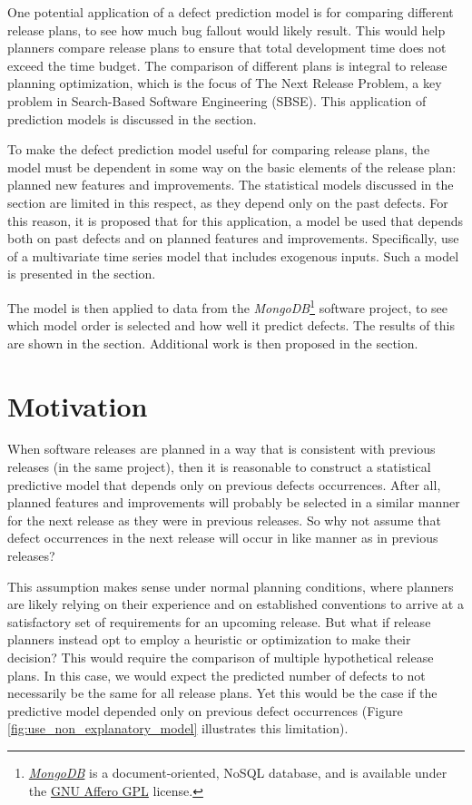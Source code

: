 \documentclass[a4paper]{scrartcl}
\begin{document}
One potential application of a defect prediction model is for comparing different release plans, to see how much bug fallout would likely result. This would help planners compare release plans to ensure that total development time does not exceed the time budget. The comparison of different plans is integral to release planning optimization, which is the focus of The Next Release Problem, a key problem in Search-Based Software Engineering (SBSE). This application of prediction models is discussed in the  section.

To make the defect prediction model useful for comparing release plans, the model must be dependent in some way on the basic elements of the release plan: planned new features and improvements. The statistical models discussed in the  section are limited in this respect, as they depend only on the past defects. For this reason, it is proposed that for this application, a model be used that depends both on past defects and on planned features and improvements. Specifically, use of a multivariate time series model that includes exogenous inputs. Such a model is presented in the  section.

The model is then applied to data from the \textit{MongoDB}\footnote{\href{https://www.mongodb.org}{\textit{MongoDB}} is a document-oriented, NoSQL database, and is available under the \href{https://gnu.org/licenses/agpl.html}{GNU Affero GPL} license.} software project, to see which model order is selected and how well it predict defects. The results of this are shown in the  section. Additional work is then proposed in the  section.

\section*{Motivation}
\label{sec:motivation}

When software releases are planned in a way that is consistent with previous releases (in the same project), then it is reasonable to construct a statistical predictive model that depends only on previous defects occurrences. After all, planned features and improvements will probably be selected in a similar manner for the next release as they were in previous releases. So why not assume that defect occurrences in the next release will occur in like manner as in previous releases?

This assumption makes sense under normal planning conditions, where planners are likely relying on their experience and on established conventions to arrive at a satisfactory set of requirements for an upcoming release. But what if release planners instead opt to employ a heuristic or optimization to make their decision? This would require the comparison of multiple hypothetical release plans. In this case, we would expect the predicted number of defects to not necessarily be the same for all release plans. Yet this would be the case if the predictive model depended only on previous defect occurrences (Figure \ref{fig:use_non_explanatory_model} illustrates this limitation).
\end{document}
